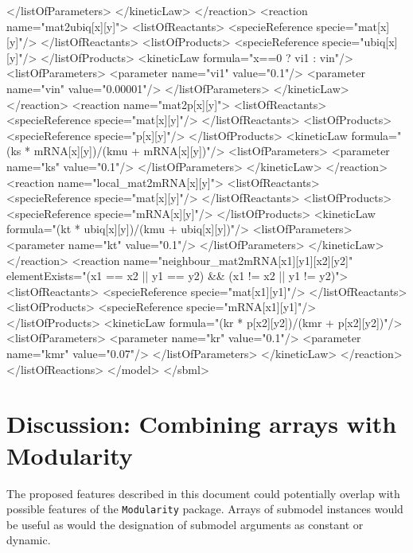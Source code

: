 \documentclass{cekarticle}
\begin{document}
\begin{example}
                </listOfParameters>
            </kineticLaw>
        </reaction>
        <reaction name="mat2ubiq[x][y]">
            <listOfReactants>
                <specieReference specie="mat[x][y]"/>
            </listOfReactants>
            <listOfProducts>
                <specieReference specie="ubiq[x][y]"/>
            </listOfProducts>
            <kineticLaw formula="x==0 ? vi1 : vin"/>
                <listOfParameters>
                    <parameter name="vi1" value="0.1"/>
                    <parameter name="vin" value="0.00001"/>
                </listOfParameters>
            </kineticLaw>
        </reaction>
        <reaction name="mat2p[x][y]">
            <listOfReactants>
                <specieReference specie="mat[x][y]"/>
            </listOfReactants>
            <listOfProducts>
                <specieReference specie="p[x][y]"/>
            </listOfProducts>
            <kineticLaw formula="(ks * mRNA[x][y])/(kmu + mRNA[x][y])"/>
                <listOfParameters>
                    <parameter name="ks" value="0.1"/>
                </listOfParameters>
            </kineticLaw>
        </reaction>
        <reaction name="local_mat2mRNA[x][y]">
            <listOfReactants>
                <specieReference specie="mat[x][y]"/>
            </listOfReactants>
            <listOfProducts>
                <specieReference specie="mRNA[x][y]"/>
            </listOfProducts>
            <kineticLaw formula="(kt * ubiq[x][y])/(kmu + ubiq[x][y])"/>
                <listOfParameters>
                    <parameter name="kt" value="0.1"/>
                </listOfParameters>
            </kineticLaw>
        </reaction>
        <reaction name="neighbour_mat2mRNA[x1][y1][x2][y2]"
                  elementExists="(x1 == x2 || y1 == y2) && (x1 != x2 || y1 != y2)">
            <listOfReactants>
                <specieReference specie="mat[x1][y1]"/>
            </listOfReactants>
            <listOfProducts>
                <specieReference specie="mRNA[x1][y1]"/>
            </listOfProducts>
            <kineticLaw formula="(kr * p[x2][y2])/(kmr + p[x2][y2])"/>
                <listOfParameters>
                    <parameter name="kr" value="0.1"/>
                    <parameter name="kmr" value="0.07"/>
                </listOfParameters>
            </kineticLaw>
        </reaction>
    </listOfReactions>
</model>
</sbml>
\end{example}

\section{Discussion: Combining arrays with Modularity}
The proposed features described in this document could
potentially overlap with possible features of the
\texttt{Modularity} package. Arrays of submodel instances would
be useful as would the designation of submodel arguments as
constant or dynamic.
\appendix
\end{document}
